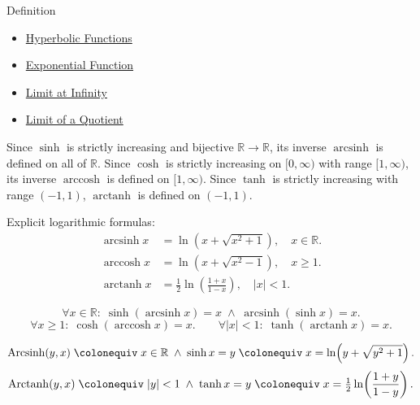\begin{definitionbox}{Definition}

\begin{dependencies}
\begin{itemize}
  \item \hyperref[def:hyperbolic]{Hyperbolic Functions}
  \item \hyperref[def:exponential]{Exponential Function}
  \item \hyperref[def:limit-at-infinity]{Limit at Infinity}
  \item \hyperref[thm:limit-quotient]{Limit of a Quotient}
\end{itemize}
\end{dependencies}
\begin{definition}
\label{def:inverse-hyperbolic}
Since $\sinh$ is strictly increasing and bijective $\mathbb{R} \to
\mathbb{R}$, its inverse $\operatorname{arcsinh}$ is defined on all
of $\mathbb{R}$. Since $\cosh$ is strictly increasing on
$[0,\infty)$ with range $[1,\infty)$, its inverse
$\operatorname{arccosh}$ is defined on $[1,\infty)$. Since $\tanh$
is strictly increasing with range $(-1,1)$, $\operatorname{arctanh}$
is defined on $(-1,1)$.

Explicit logarithmic formulas:
\begin{align*}
  \operatorname{arcsinh} x
  &= \ln\!\left(x + \sqrt{x^2+1}\right),
  \quad x \in \mathbb{R}. \\
  \operatorname{arccosh} x
  &= \ln\!\left(x + \sqrt{x^2-1}\right),
  \quad x \geq 1. \\
  \operatorname{arctanh} x
  &= \tfrac{1}{2}\ln\!\left(\frac{1+x}{1-x}\right),
  \quad |x| < 1.
\end{align*}
\end{definition}
\end{definitionbox}\begin{remark*}
\[
  \forall x\in\mathbb{R}:\;
  \sinh(\operatorname{arcsinh} x)=x
  \;\wedge\;
  \operatorname{arcsinh}(\sinh x)=x.
\]
\[
  \forall x\geq 1:\;
  \cosh(\operatorname{arccosh} x)=x.
  \qquad
  \forall |x|<1:\;
  \tanh(\operatorname{arctanh} x)=x.
\]
\end{remark*}

\begin{remark*}
\[
  \operatorname{Arcsinh}(y,x)
  \;\colonequiv\;
  x\in\mathbb{R} \;\wedge\; \sinh x = y
  \;\colonequiv\;
  x = \ln\!\left(y+\sqrt{y^2+1}\right).
\]
\[
  \operatorname{Arctanh}(y,x)
  \;\colonequiv\;
  |y|<1 \;\wedge\; \tanh x = y
  \;\colonequiv\;
  x = \tfrac{1}{2}\ln\!\left(\frac{1+y}{1-y}\right).
\]
\end{remark*}

